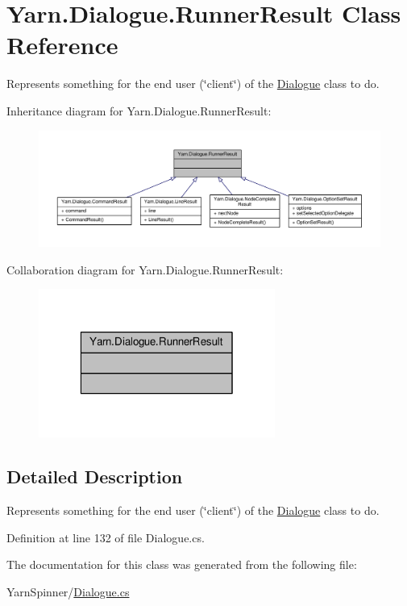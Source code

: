 \hypertarget{a00146}{\section{Yarn.\-Dialogue.\-Runner\-Result Class Reference}
\label{a00146}
}


Represents something for the end user (\char`\"{}client\char`\"{}) of the \hyperlink{a00082}{Dialogue} class to do.  




Inheritance diagram for Yarn.\-Dialogue.\-Runner\-Result\-:
\nopagebreak
\begin{figure}[H]
\begin{center}
\leavevmode
\includegraphics[width=350pt]{a00613}
\end{center}
\end{figure}


Collaboration diagram for Yarn.\-Dialogue.\-Runner\-Result\-:
\nopagebreak
\begin{figure}[H]
\begin{center}
\leavevmode
\includegraphics[width=220pt]{a00614}
\end{center}
\end{figure}


\subsection{Detailed Description}
Represents something for the end user (\char`\"{}client\char`\"{}) of the \hyperlink{a00082}{Dialogue} class to do. 

Definition at line 132 of file Dialogue.\-cs.



The documentation for this class was generated from the following file\-:\begin{DoxyCompactItemize}
\item 
Yarn\-Spinner/\hyperlink{a00290}{Dialogue.\-cs}\end{DoxyCompactItemize}

